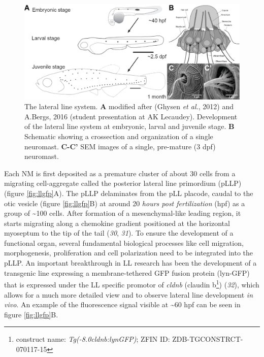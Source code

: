 \documentclass[10pt, b5paper, singlespacinge, twoside]{reedthesis} %
\theoremstyle{definition}
\theoremstyle{definition}
\theoremstyle{definition}
\theoremstyle{remark}
\begin{document}
\begin{figure}

{\centering \includegraphics[width=0.85\linewidth]{figures/intro/ll_system} 

}

\caption[The lateral line system]{The lateral line system. \textbf{A} modified after (Ghysen \emph{et al.}, 2012) and A.Bergs, 2016 (student presentation at AK Lecaudey). Development of the lateral line system at embryonic, larval and juvenile stage. \textbf{B} Schematic showing a crossection and organization of a single neuromast. \textbf{C-C'} SEM images of a single, pre-mature (3 dpf) neuromast.}\label{fig:llsystem}
\end{figure}
Each NM is first deposited as a premature cluster of about 30 cells from a migrating cell-aggregate called the posterior lateral line primordium (pLLP) (figure \ref{fig:llgfp}A). The pLLP delaminates from the pLL placode, caudal to the otic vesicle (figure \ref{fig:llgfp}B) at around 20 \emph{hours post fertilization} (hpf) as a group of \textasciitilde100 cells. After formation of a mesenchymal-like leading region, it starts migrating along a chemokine gradient positioned at the horizontal myoseptum to the tip of the tail (\emph{30}, \emph{31}). To ensure the development of a functional organ, several fundamental biological processes like cell migration, morphogenesis, proliferation and cell polarization need to be integrated into the pLLP.
An important breakthrough in LL research has been the development of a transgenic line expressing a membrane-tethered GFP fusion protein (lyn-GFP) that is expressed under the LL specific promotor of \emph{cldnb} (claudin b\footnote{construct name: \emph{Tg(-8.0cldnb:lynGFP)}; ZFIN ID: ZDB-TGCONSTRCT-070117-15}) (\emph{32}), which allows for a much more detailed view and to observe lateral line development \emph{in vivo}. An example of the fluorescence signal visible at \textasciitilde60 hpf can be seen in figure \ref{fig:llgfp}B.
\end{document}
